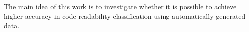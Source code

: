 \documentclass[%
class=scrreprt,
chapterprefix=false,%
open=right,%
twoside=false,%
paper=a4,%
logofile={Logo\_zentral\_farbig\_EN.png},%
thesistype=master,%
UKenglish,%
]{se2thesis}
\theoremstyle{definition}
\begin{document}
	The main idea of this work is to investigate whether it is possible to achieve higher accuracy in code readability classification using automatically generated data. 
	
		
\end{document}
